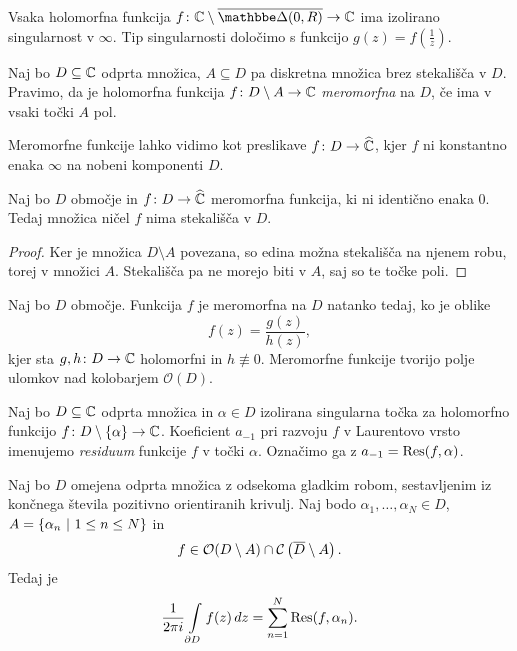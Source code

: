 \begin{opomba}
Vsaka holomorfna funkcija
$f \colon \C \setminus \oline{\dsk(0,R)} \to \C$ ima izolirano
singularnost v $\infty$. Tip singularnosti določimo s funkcijo
$g(z) = f\left(\frac{1}{z}\right)$.
\end{opomba}

\begin{definicija}
Naj bo $D \subseteq \mathbb{C}$ odprta množica, $A \subseteq D$ pa
diskretna množica brez stekališča v $D$. Pravimo, da je holomorfna
funkcija $f \colon D \setminus A \to \mathbb{C}$
\emph{meromorfna} na $D$, če ima v vsaki
točki $A$ pol.
\end{definicija}

\begin{opomba}
Meromorfne funkcije lahko vidimo kot preslikave
$f \colon D \to \widehat{\mathbb{C}}$, kjer $f$ ni konstantno enaka
$\infty$ na nobeni komponenti $D$.
\end{opomba}

\begin{trditev}
Naj bo $D$ območje in $f \colon D \to \widehat{\mathbb{C}}$ meromorfna
funkcija, ki ni identično enaka $0$. Tedaj množica ničel $f$ nima
stekališča v $D$.
\end{trditev}

\begin{proof}
Ker je množica $D \setminus A$ povezana, so edina možna stekališča
na njenem robu, torej v množici $A$. Stekališča pa ne morejo biti v
$A$, saj so te točke poli.
\end{proof}

\begin{opomba}
Naj bo $D$ območje. Funkcija $f$ je meromorfna na $D$ natanko
tedaj, ko je oblike
\[
f(z) = \frac{g(z)}{h(z)},
\]
kjer sta $g, h \colon D \to \mathbb{C}$ holomorfni in $h \not \equiv 0$.
Meromorfne funkcije tvorijo polje ulomkov nad kolobarjem
$\mathcal{O}(D)$.
\end{opomba}

\begin{definicija}
Naj bo $D \subseteq \mathbb{C}$ odprta množica in $\alpha \in D$ izolirana
singularna točka za holomorfno funkcijo
$f \colon D \setminus \left\{\alpha\right\} \to \mathbb{C}$. Koeficient $a_{-1}$
pri razvoju $f$ v Laurentovo vrsto imenujemo
\emph{residuum} funkcije $f$ v točki
$\alpha$. Označimo ga z $a_{-1} = \operatorname{Res}(f, \alpha)$.
\end{definicija}

\begin{izrek}[O residuih]
Naj bo $D$ omejena odprta množica z odsekoma gladkim robom,
sestavljenim iz končnega števila pozitivno orientiranih krivulj.
Naj bodo $\alpha_1, \dots, \alpha_N \in D$,
$A = \left\{\alpha_n~\middle\vert~1 \leq n \leq N\right\}$ in
\[
f \in \mathcal{O}(D \setminus A) \cap
\mathcal{C}\left(\overline{D} \setminus A\right).
\]
Tedaj je
\[
\frac{1}{2 \pi i} \int\limits_{\partial D} f(z)\,dz =
\sum_{n = 1}^N \operatorname{Res}(f, \alpha_n).
\]
\end{izrek}

